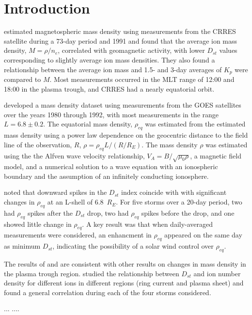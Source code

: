 \documentclass[10pt,twocolumn]{article}
\begin{document}
\section{Introduction}

\cite{Takahashi2006} estimated magnetospheric mass density using measurements from the CRRES satellite during a 73-day period and 1991 and found that the average ion mass density, $M=\rho/n_e$, correlated with geomagnetic activity, with lower $D_{st}$ values corresponding to slightly average ion mass densities.  They also found a relationship between the average ion mass and 1.5- and 3-day averages of $K_p$ were compared to $M$.  Most measurements occurred in the MLT range of 12:00 and 18:00 in the plasma trough, and CRRES had a nearly equatorial orbit.

\cite{Takahashi2010} developed a mass density dataset using measurements from the GOES satellites over the years 1980 through 1992, with most measurements in the range $L=6.8\pm0.2$. The equatorial mass density, $\rho_{eq}$ was estimated from the estimated mass density using a power law dependence on the geocentric distance to the field line of the observation, $R$, $\rho=\rho_{eq}L/(R/R_E)$. The mass density $\rho$ was estimated using the the Alfven wave velocity relationship, $V_A=B/\sqrt{\mu_0\rho}$, a magnetic field model, and a numerical solution to a wave equation with an ionospheric boundary and the assumption of an infinitely conducting ionosphere.  

\cite{Takahashi2010} noted that downward spikes in the $D_{st}$ index coincide with with significant changes in $\rho_{eq}$ at an L-shell of 6.8~$R_E$. For five storms over a 20-day period, two had $\rho_{eq}$ spikes after the $D_{st}$ drop, two had $\rho_{eq}$ spikes before the drop, and one showed little change in $\rho_{eq}$.  A key result was that when daily-averaged measurements were considered, an enhancment in $\rho_{eq}$ appeared on the same day as minimum $D_{st}$, indicating the possibility of a solar wind control over $\rho_{eq}$.

The results of \cite{Takahashi2006} and \cite{Takahashi2010} are consistent with other results on changes in mass density in the plasma trough region.  \cite{Yao2008} studied the relationship between $D_{st}$ and ion number density for different ions in different regions (ring current and plasma sheet) and found a general correlation during each of the four storms considered.

\cite{Hamilton1988} ... \cite{Gallagher1988} .... 
\end{document}
